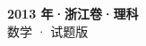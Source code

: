\documentclass[zihao=-4, a4paper]{ctexart}
\begin{document}
\begin{center}
  {\Large\bfseries 2013 年·浙江卷·理科}\\[4pt]
  {\large 数学 · 试题版}
\end{center}
\medskip
{}

\end{document}
